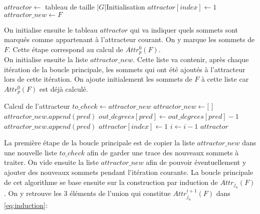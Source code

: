 \documentclass[12pt,a4paper,oneside,titlepage]{report}
\begin{document}
\begin{algorithm}[H]
\begin{algorithmic}[1]
	\State $attractor \gets$ tableau de taille $|G|$\Comment Initialisation
		\State $attractor[index] \gets 1$
	\EndFor
	\State $attractor\_new \gets F$
\end{algorithmic}
\end{algorithm}
On initialise ensuite le tableau $attractor$ qui va indiquer quels sommets sont marqués comme appartenant à l'attracteur courant. On y marque les sommets de $F$. Cette étape correspond au calcul de $Attr^0_p(F)$.\\
On initialise ensuite la liste $attractor\_new$. Cette liste va contenir, après chaque itération de la boucle principale, les sommets qui ont été ajoutés à l'attracteur lors de cette itération. On ajoute initialement les sommets de $F$ à cette liste car $Attr^0_p(F)$ est déjà calculé.
\begin{algorithm}[H]
\begin{algorithmic}[1]
	\Comment Calcul de l'attracteur
		\State $to\_check \gets attractor\_new$
		\State $attractor\_new \gets [$ $]$
						\State $attractor\_new.append(pred)$
					\Else
						\State $out\_degrees[pred]\gets out\_degrees[pred]-1$
							\State $attractor\_new.append(pred)$
						\EndIf
					\EndIf
				\EndIf
			\EndFor
		\EndFor
			\State $attractor[index]\gets 1$
		\EndFor
		\State $i\gets i-1$
	\EndWhile
	\State\Return $attractor$
\EndProcedure
\end{algorithmic}
\end{algorithm}
La première étape de la boucle principale est de copier la liste $attractor\_new$ dans une nouvelle liste $to\_check$ afin de garder une trace des nouveaux sommets à traiter. On vide ensuite la liste $attractor\_new$ afin de pouvoir éventuellement y ajouter des nouveaux sommets pendant l'itération courante. La boucle principale de cet algorithme se base ensuite sur la construction par induction de $Attr_{j_n}(F)$. On y retrouve les 3 éléments de l'union qui constitue $Attr^{i+1}_{j_n}(F)$ dans \ref{eq:induction}:
\end{document}

